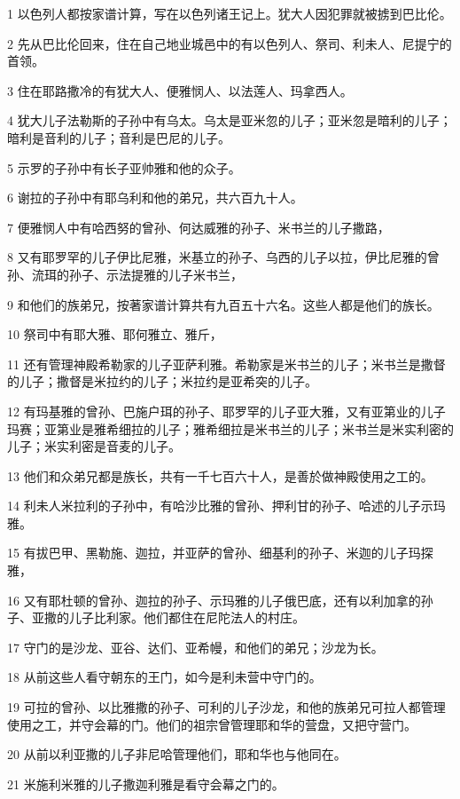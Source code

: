 \par 1 以色列人都按家谱计算，写在以色列诸王记上。犹大人因犯罪就被掳到巴比伦。
\par 2 先从巴比伦回来，住在自己地业城邑中的有以色列人、祭司、利未人、尼提宁的首领。
\par 3 住在耶路撒冷的有犹大人、便雅悯人、以法莲人、玛拿西人。
\par 4 犹大儿子法勒斯的子孙中有乌太。乌太是亚米忽的儿子；亚米忽是暗利的儿子；暗利是音利的儿子；音利是巴尼的儿子。
\par 5 示罗的子孙中有长子亚帅雅和他的众子。
\par 6 谢拉的子孙中有耶乌利和他的弟兄，共六百九十人。
\par 7 便雅悯人中有哈西努的曾孙、何达威雅的孙子、米书兰的儿子撒路，
\par 8 又有耶罗罕的儿子伊比尼雅，米基立的孙子、乌西的儿子以拉，伊比尼雅的曾孙、流珥的孙子、示法提雅的儿子米书兰，
\par 9 和他们的族弟兄，按著家谱计算共有九百五十六名。这些人都是他们的族长。
\par 10 祭司中有耶大雅、耶何雅立、雅斤，
\par 11 还有管理神殿希勒家的儿子亚萨利雅。希勒家是米书兰的儿子；米书兰是撒督的儿子；撒督是米拉约的儿子；米拉约是亚希突的儿子。
\par 12 有玛基雅的曾孙、巴施户珥的孙子、耶罗罕的儿子亚大雅，又有亚第业的儿子玛赛；亚第业是雅希细拉的儿子；雅希细拉是米书兰的儿子；米书兰是米实利密的儿子；米实利密是音麦的儿子。
\par 13 他们和众弟兄都是族长，共有一千七百六十人，是善於做神殿使用之工的。
\par 14 利未人米拉利的子孙中，有哈沙比雅的曾孙、押利甘的孙子、哈述的儿子示玛雅。
\par 15 有拔巴甲、黑勒施、迦拉，并亚萨的曾孙、细基利的孙子、米迦的儿子玛探雅，
\par 16 又有耶杜顿的曾孙、迦拉的孙子、示玛雅的儿子俄巴底，还有以利加拿的孙子、亚撒的儿子比利家。他们都住在尼陀法人的村庄。
\par 17 守门的是沙龙、亚谷、达们、亚希幔，和他们的弟兄；沙龙为长。
\par 18 从前这些人看守朝东的王门，如今是利未营中守门的。
\par 19 可拉的曾孙、以比雅撒的孙子、可利的儿子沙龙，和他的族弟兄可拉人都管理使用之工，并守会幕的门。他们的祖宗曾管理耶和华的营盘，又把守营门。
\par 20 从前以利亚撒的儿子非尼哈管理他们，耶和华也与他同在。
\par 21 米施利米雅的儿子撒迦利雅是看守会幕之门的。
